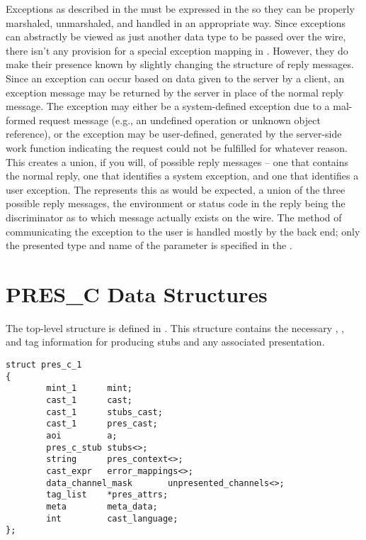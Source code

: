Exceptions as described in the \IDL{} must be expressed in the \PRESC{} so they
can be properly marshaled, unmarshaled, and handled in an appropriate way.
Since exceptions can abstractly be viewed as just another data type to be
passed over the wire, there isn't any provision for a special exception mapping
in \PRESC{}\@.  However, they do make their presence known by slightly changing
the structure of reply messages.  Since an exception can occur based on data
given to the server by a client, an exception message may be returned by the
server in place of the normal reply message.  The exception may either be a
system-defined exception due to a mal-formed request message (e.g., an
undefined operation or unknown object reference), or the exception may be
user-defined, generated by the server-side work function indicating the request
could not be fulfilled for whatever reason.  This creates a union, if you will,
of possible reply messages -- one that contains the normal reply, one that
identifies a system exception, and one that identifies a user exception.  The
\PRESC{} represents this as would be expected, a union of the three possible
reply messages, the environment or status code in the reply being the
discriminator as to which message actually exists on the wire.  The method of
communicating the exception to the user is handled mostly by the back end; only
the presented type and name of the parameter is specified in the \PRESC{}\@.



\section{PRES\_C Data Structures}
\label{sec:PRESC:PRESC Data Structures}

The top-level \PRESC{} structure is defined in .  This
structure contains the necessary \MINT{}, \CAST{}, and tag information for
producing stubs and any associated presentation.

\begin{verbatim}
struct pres_c_1
{
        mint_1      mint;
        cast_1      cast;
        cast_1      stubs_cast;
        cast_1      pres_cast;
        aoi         a;
        pres_c_stub stubs<>;
        string      pres_context<>;
        cast_expr   error_mappings<>;
        data_channel_mask       unpresented_channels<>;
        tag_list    *pres_attrs;
        meta        meta_data;
        int         cast_language;
};
\end{verbatim}


